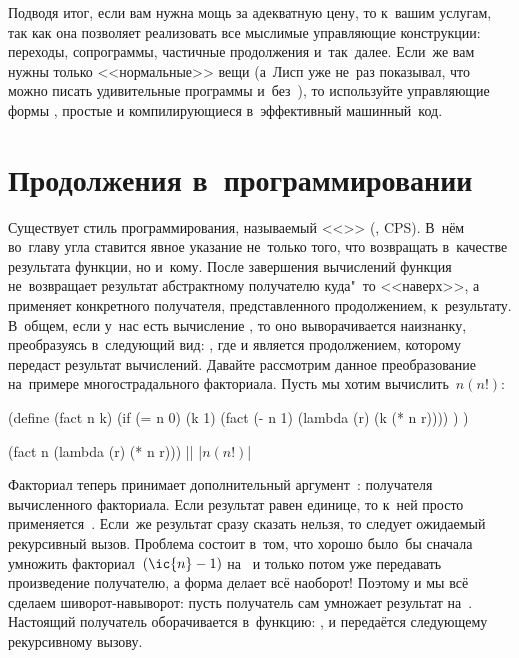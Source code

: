 \bigskip

Подводя итог, если вам нужна мощь за адекватную цену, то  к~вашим
услугам, так как она позволяет реализовать все мыслимые управляющие конструкции:
переходы, сопрограммы, частичные продолжения и~так~далее. Если~же вам нужны
только <<нормальные>> вещи (а~Лисп уже не~раз показывал, что можно писать
удивительные программы и~без~), то используйте управляющие формы
{\CommonLisp}, простые и компилирующиеся в~эффективный машинный~код.


\section{Продолжения в~программировании}\label{escape/sect:pr-cont}

Существует стиль программирования, называемый <<>> (, CPS). В~нём во~главу угла
ставится явное указание не~только того, что возвращать в~качестве результата
функции, но и~кому. После завершения вычислений функция не~возвращает результат
абстрактному получателю куда"~то <<наверх>>, а применяет конкретного получателя,
представленного продолжением, к~результату. В~общем, если у~нас есть вычисление
, то оно выворачивается наизнанку, преобразуясь в~следующий вид:
, где  и является продолжением, которому 
передаст результат вычислений. Давайте рассмотрим данное преобразование
на~примере многострадального факториала. Пусть мы хотим вычислить~$n(n!)$:

\begin{code:lisp}
(define (fact n k)
  (if (= n 0) (k 1)
      (fact (- n 1) (lambda (r) (k (* n r)))) ) )

(fact n (lambda (r) (* n r))) |\is| |$n(n!)$|
\end{code:lisp}

Факториал теперь принимает дополнительный аргумент~: получателя
вычисленного факториала. Если результат равен единице, то к~ней просто
применяется~. Если~же результат сразу сказать нельзя, то следует ожидаемый
рекурсивный вызов. Проблема состоит в~том, что хорошо было~бы сначала умножить
факториал~$(\ic{n} - 1)$ на~ и только потом уже передавать произведение
получателю, а форма  делает всё наоборот! Поэтому
и мы всё сделаем шиворот-навыворот: пусть получатель сам умножает результат
на~. Настоящий получатель оборачивается в~функцию: , и передаётся следующему рекурсивному вызову.

